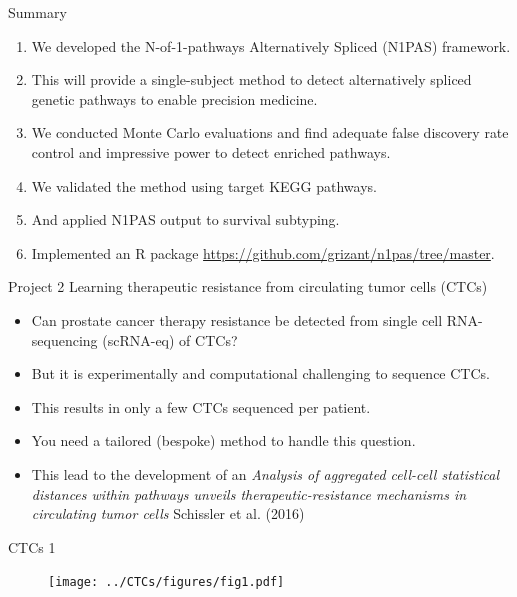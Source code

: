 \documentclass[ignorenonframetext,aspectratio=169,]{beamer}
\providecommand{\tightlist}{%
  \setlength{\itemsep}{0pt}\setlength{\parskip}{0pt}}
\begin{document}
\begin{frame}{%
\protect\hypertarget{summary}{%
Summary}}

\begin{enumerate}
  \item We developed the N-of-1-pathways Alternatively Spliced (N1PAS) framework.
    \item This will provide a single-subject method to detect alternatively spliced genetic pathways to enable precision medicine.
    \item We conducted Monte Carlo evaluations and find adequate false discovery rate control and impressive power to detect enriched pathways.
    \item We validated the method using target KEGG pathways.
    \item And applied N1PAS output to survival subtyping.
    \item Implemented an R package \url{https://github.com/grizant/n1pas/tree/master}.
  \end{enumerate}

\end{frame}

\begin{frame}{%
\protect\hypertarget{project-2-learning-therapeutic-resistance-from-circulating-tumor-cells-ctcs}{%
Project 2 Learning therapeutic resistance from circulating tumor cells
(CTCs)}}

\begin{itemize}
\tightlist
\item
  Can prostate cancer therapy resistance be detected from single cell
  RNA-sequencing (scRNA-eq) of CTCs?
\item
  But it is experimentally and computational challenging to sequence
  CTCs.
\item
  This results in only a few CTCs sequenced per patient.
\item
  You need a tailored (bespoke) method to handle this question.
\item
  This lead to the development of an \emph{Analysis of aggregated
  cell-cell statistical distances within pathways unveils
  therapeutic-resistance mechanisms in circulating tumor cells}
  Schissler et al. (2016)
\end{itemize}

\end{frame}

\begin{frame}{%
\protect\hypertarget{ctcs-1}{%
CTCs 1}}

\begin{figure}[htb]
  \centering \texttt{[image: ../CTCs/figures/fig1.pdf]}
\end{figure}

\end{frame}
\end{document}
